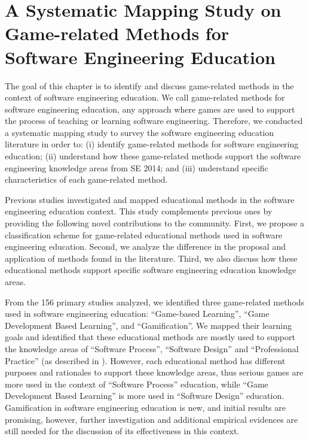 \chapter{A Systematic Mapping Study on Game-related Methods for Software Engineering Education}
\label{ch:sms}

The goal of this chapter is to identify and discuss game-related methods in the context of software engineering education. We call game-related methods for software engineering education, any approach where games are used to support the process of teaching or learning software engineering. Therefore, we conducted a systematic mapping study to survey the software engineering education literature in order to: (i) identify game-related methods for software engineering education; (ii) understand how these game-related methods support the software engineering knowledge areas from SE 2014; and (iii) understand specific characteristics of each game-related method. 

Previous studies \citep{Marques:2014, Malik:2012, Caulfield:2011, Kosa:2016} investigated and mapped educational methods in the software engineering education context. This study complements previous ones by providing the following novel contributions to the community. First, we propose a classification scheme for game-related educational methods used in software engineering education. Second, we analyze the difference in the proposal and application of methods found in the literature. Third, we also discuss how these educational methods support specific software engineering education knowledge areas.

From the 156 primary studies analyzed, we identified three game-related methods used in software engineering education: “Game-based Learning”, “Game Development Based Learning”, and “Gamification”. We mapped their learning goals and identified that these educational methods are mostly used to support the knowledge areas of “Software Process”, “Software Design” and “Professional Practice” (as described in \cite{Acm:2015}). However, each educational method has different purposes and rationales to support these knowledge areas, thus serious games are more used in the context of “Software Process” education, while “Game Development Based Learning” is more used in “Software Design” education. Gamification in software engineering education is new, and initial results are promising, however, further investigation and additional empirical evidences are still needed for the discussion of its effectiveness in this context.

